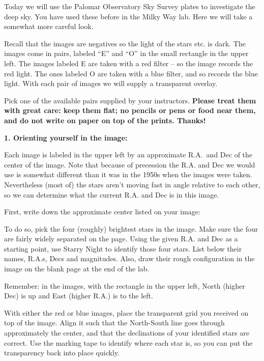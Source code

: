 
\noindent Today we will use the Palomar Observatory Sky Survey
plates to investigate the deep sky.  You have used these before in the
Milky Way lab.  Here we will take a somewhat more careful look. 

Recall that the images are negatives so the light of the stars etc. is
dark. The images come in pairs, labeled ``E'' and ``O'' in the small
rectangle in the upper left. The images labeled E are taken with a red
filter -- so the image records the red light. The ones labeled O are
taken with a blue filter, and so records the blue light. With
each pair of images we will supply a transparent overlay.

Pick one of the available pairs supplied by your instructors.  {\bf
Please treat them with great care: keep them flat; no pencils or pens
or food near them, and do not write on paper on top of the
prints. Thanks!}

\noindent
{\bf 1. Orienting yourself in the image:} 

\noindent Each image is labeled in the upper left by an approximate
R.A.~and Dec of the center of the image.  Note that because of
precession the R.A. and Dec we would use is somewhat different than it
was in the 1950s when the images were taken. Nevertheless (most of)
the stars aren't moving fast in angle relative to each other, so we
can determine what the current R.A. and Dec is in this image.

\noindent First, write down the approximate center listed on your
image:

\vspace{40pt}

\noindent To do so, pick the four (roughly) brightest stars in the
image. Make sure the four are fairly widely separated on the page.
Using the given R.A. and Dec as a starting point, use Starry Night to
identify those four stars. List below their names, R.A.s, Decs and
magnitudes. Also, draw their rough configuration in the image on the
blank page at the end of the lab.

\noindent Remember: in the images, with the rectangle in the upper
left, North (higher Dec) is up and East (higher R.A.) is to the left.

\clearpage


\noindent With either the red or blue images, place the transparent
grid you received on top of the image. Align it such that the
North-South line goes through approximately the center, and that the
declinations of your identified stars are correct. Use the marking
tape to identify where each star is, so you can put the transparency
back into place quickly.

